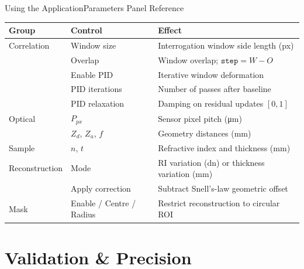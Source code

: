 \documentclass[9pt, aspectratio=169]{beamer}
\newcommand{\theadrow}{\rowcolor{accentlight}}
\begin{document}
\begin{frame}{Using the Application}{Parameters Panel Reference}
  \begin{center}
    \small
    \begin{tabular}{llp{7.2cm}}
      \toprule
      \theadrow Group & Control & Effect \\
      \midrule
      Correlation & Window size       & Interrogation window side length (px) \\
                  & Overlap           & Window overlap; $\texttt{step}=W-O$ \\
                  & Enable PID        & Iterative window deformation \\
                  & PID iterations    & Number of passes after baseline \\
                  & PID relaxation    & Damping on residual updates $[0,1]$ \\
      \midrule
      Optical     & $P_{px}$          & Sensor pixel pitch (\si{\micro\metre}) \\
                  & $Z_d$, $Z_a$, $f$ & Geometry distances (\si{mm}) \\
      \midrule
      Sample      & $n$, $t$          & Refractive index and thickness (\si{mm}) \\
      \midrule
      Reconstruction & Mode           & RI variation (dn) or thickness variation (mm) \\
                     & Apply correction & Subtract Snell's-law geometric offset \\
      \midrule
      Mask        & Enable / Centre / Radius & Restrict reconstruction to circular ROI \\
      \bottomrule
    \end{tabular}
  \end{center}
\end{frame}

\section{Validation \& Precision}
\end{document}
